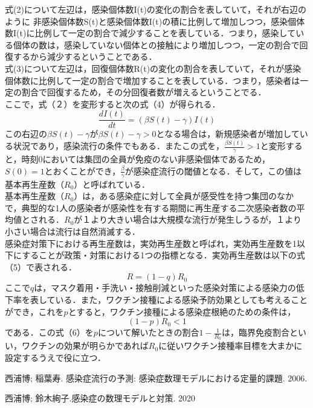 \documentclass{jarticle}
\begin{document}
式(2)について左辺は，感染個体数I(t)の変化の割合を表していて，それが右辺のように 非感染個体数S(t)と感染個体数I(t)の積に比例して増加しつつ，感染個体数I(t)に比例して一定の割合で減少することを表している．つまり，感染している個体の数は，感染していない個体との接触により増加しつつ，一定の割合で回復するから減少するということである．\\
式(3)について左辺は，回復個体数R(t)の変化の割合を表していて，それが感染個体数に比例して一定の割合で増加することを表している．つまり，感染者は一定の割合で回復するため，その分回復者数が増えるということでる．\\
ここで，式（２）を変形すると次の式（4）が得られる．\\
\begin{equation}
\frac{dI(t)}{dt} = (\beta S(t)-\gamma) I(t)
\end{equation}
この右辺の$\beta S(t)-\gamma$が$\beta S(t)-\gamma >0$となる場合は，新規感染者が増加している状況であり，感染流行の条件でもある．またこの式を，$\frac{\beta S(t)}{\gamma} > 1$と変形すると，時刻0においては集団の全員が免疫のない非感染個体であるため，$S(0) = 1$とおくことができ，$\frac{\beta}{\gamma}$が感染症流行の閾値となる．そして，この値は基本再生産数（$R_{0}$）と呼ばれている．\\
基本再生産数（$R_{0}$）は，ある感染症に対して全員が感受性を持つ集団のなかで，典型的な1人の感染者が感染性を有する期間に再生産する二次感染者数の平均値とされる．$R_{0}$が１より大きい場合は大規模な流行が発生しうるが，１より小さい場合は流行は自然消滅する．\\
感染症対策下における再生産数は，実効再生産数と呼ばれ，実効再生産数を1以下にすることが政策・対策における1つの指標となる．実効再生産数は以下の式（5）で表される．
\begin{equation}
R = (1-q) R_{0}
\end{equation}
ここで$q$は，マスク着用・手洗い・接触削減といった感染対策による感染力の低下率を表している．また，ワクチン接種による感染予防効果としても考えることができ，これを$p$とすると，ワクチン接種による感染症根絶のための条件は，
\begin{equation}
(1-p) R_{0} < 1
\end{equation}
である．この式（6）を$p$について解いたときの割合$1-\frac{1}{R_{0}}$は，臨界免疫割合といい，ワクチンの効果が明らかであれば$R_{0}$に従いワクチン接種率目標を大まかに設定するうえで役に立つ．

\begin{thebibliography}{99}
  \item 西浦博; 稲葉寿. 感染症流行の予測: 感染症数理モデルにおける定量的課題. 2006.
  \item 西浦博; 鈴木絢子.感染症の数理モデルと対策. 2020
\end{thebibliography}
\end{document}
